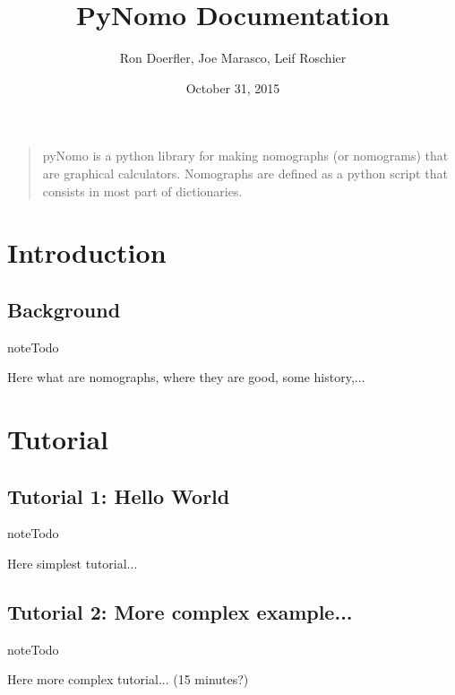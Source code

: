 \documentclass[a4paper,11pt,english]{sphinxmanual}
\title{PyNomo Documentation}
\date{October 31, 2015}
\author{Ron Doerfler, Joe Marasco, Leif Roschier}
\begin{document}
\maketitle
\tableofcontents
{}\label{index::doc}

\begin{quote}

pyNomo is a python library for making nomographs (or nomograms) that are graphical calculators.
Nomographs are defined as a python script that consists
in most part of dictionaries.
\end{quote}


\chapter{Introduction}
\label{introduction/introduction:introduction}\label{introduction/introduction::doc}\label{introduction/introduction:pynomo-documentation}

\section{Background}
\label{introduction/introduction:background}
\begin{notice}{note}{Todo}

Here what are nomographs, where they are good, some history,...
\end{notice}


\chapter{Tutorial}
\label{tutorials/tutorials::doc}\label{tutorials/tutorials:tutorial}

\section{Tutorial 1: Hello World}
\label{tutorials/tutorials:tutorial-1-hello-world}
\begin{notice}{note}{Todo}

Here simplest tutorial...
\end{notice}


\section{Tutorial 2: More complex example...}
\label{tutorials/tutorials:tutorial-2-more-complex-example}
\begin{notice}{note}{Todo}

Here more complex tutorial... (15 minutes?)
\end{notice}
\end{document}
